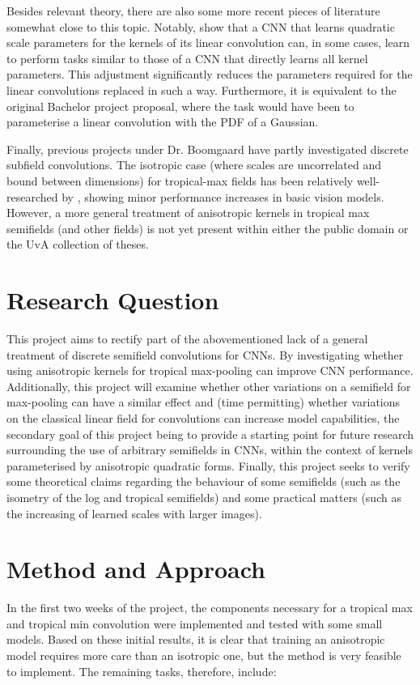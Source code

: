 \documentclass[11pt]{article} %
\begin{document}
Besides relevant theory, there are also some more recent pieces of literature somewhat close to this topic. Notably, \cite{qlin1, qlin2} show that a CNN that learns quadratic scale parameters for the kernels of its linear convolution can, in some cases, learn to perform tasks similar to those of a CNN that directly learns all kernel parameters. This adjustment significantly reduces the parameters required for the linear convolutions replaced in such a way. Furthermore, it is equivalent to the original Bachelor project proposal, where the task would have been to parameterise a linear convolution with the PDF of a Gaussian. 

Finally, previous projects under Dr. Boomgaard have partly investigated discrete subfield convolutions. The isotropic case (where scales are uncorrelated and bound between dimensions) for tropical-max fields has been relatively well-researched by \cite{thierrybsc, koenbsc}, showing minor performance increases in basic vision models. However, a more general treatment of anisotropic kernels in tropical max semifields (and other fields) is not yet present within either the public domain or the UvA collection of theses. 

\section{Research Question}
This project aims to rectify part of the abovementioned lack of a general treatment of discrete semifield convolutions for CNNs. By investigating whether using anisotropic kernels for tropical max-pooling can improve CNN performance. Additionally, this project will examine whether other variations on a semifield for max-pooling can have a similar effect and (time permitting) whether variations on the classical linear field for convolutions can increase model capabilities, the secondary goal of this project being to provide a starting point for future research surrounding the use of arbitrary semifields in CNNs, within the context of kernels parameterised by anisotropic quadratic forms. Finally, this project seeks to verify some theoretical claims regarding the behaviour of some semifields (such as the isometry of the log and tropical semifields) and some practical matters (such as the increasing of learned scales with larger images).

\section{Method and Approach}
In the first two weeks of the project, the components necessary for a tropical max and tropical min convolution were implemented and tested with some small models. Based on these initial results, it is clear that training an anisotropic model requires more care than an isotropic one, but the method is very feasible to implement. The remaining tasks, therefore, include:
\end{document}
